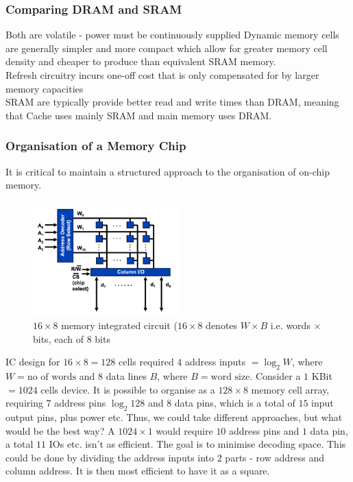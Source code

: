 \documentclass[a4paper]{article}
\theoremstyle{plain}
\theoremstyle{definition}
\theoremstyle{remark}
\begin{document}
\subsubsection{Comparing DRAM and SRAM}
Both are volatile - power must be continuously supplied
Dynamic memory cells are generally simpler and more compact which allow for greater memory cell density and cheaper to produce than equivalent SRAM memory. \\
Refresh circuitry incurs one-off cost that is only compensated for by larger memory capacities \\
SRAM are typically provide better read and write times than DRAM, meaning that Cache uses mainly SRAM and main memory uses DRAM.
\subsubsection{Organisation of a Memory Chip}
It is critical to maintain a structured approach to the organisation of on-chip memory.
\begin{figure}[H]
	\centering
	\includegraphics[width=0.5\textwidth]{figures/memorychip.png}
	\caption{$16\times 8$ memory integrated circuit ($16\times 8$ denotes $W\times B$ i.e. words $\times $ bits, each of $8$ bits}
	\label{fig:figures-memorychip-png}
\end{figure}
IC design for $16\times 8 = 128$ cells required $4$ address inputs $= \log_2W$, where $W = \text{no of words}$ and $8$ data lines $B$, where $B = \text{word size}$.
Consider a $1$ KBit $=1024$ cells device. It is possible to organise as a $128\times 8$ memory cell array, requiring $7$ address pins $\log_2 128$ and $8$ data pins, which is a total of $15$ input output pins, plus power etc. Thus, we could take different approaches, but what would be the best way? A $1024\times 1$ would require $10$ address pins and $1 $ data pin, a total $11$ IOs etc. isn't as efficient. The goal is to minimise decoding space. This could be done by dividing the address inputs into $2$ parts - row address and column address. It is then most efficient to have it as a square.
\end{document}
